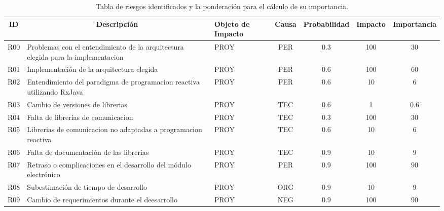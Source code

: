 \begin{table}[ht]
	\begin{tabular}{|c|m{3cm}|m{5em}|c|c|c|c|}
		\hline
		\textbf{ID} & \multicolumn{1}{c|}{\textbf{Descripción}}                                        & \textbf{Objeto de Impacto} & \textbf{Causa} & \textbf{Probabilidad} & \textbf{Impacto} & \textbf{Importancia} \\ \hline
		R00         & Problemas con el entendimiento de la arquitectura elegida para la implementacion & PROY                       & PER            & 0.3                   & 100              & 30                   \\ \hline
		R01         & Implementación de la arquitectura elegida                                        & PROY                       & PER            & 0.6                   & 100              & 60                   \\ \hline
		R02         & Entendimiento del paradigma de programacion reactiva utilizando RxJava           & PROY                       & PER            & 0.6                   & 10               & 6                    \\ \hline
		R03         & Cambio de versiones de librerias                                                 & PROY                       & TEC            & 0.6                   & 1                & 0.6                  \\ \hline
		R04         & Falta de librerías de comunicacion                                               & PROY                       & TEC            & 0.3                   & 100              & 30                   \\ \hline
		R05         & Librerias de comunicacion no adaptadas a programacion reactiva                   & PROY                       & TEC            & 0.6                   & 10               & 6                    \\ \hline
		R06         & Falta de documentación de las librerías                                          & PROY                       & TEC            & 0.9                   & 10               & 9                    \\ \hline
		R07         & Retraso o complicaciones en el desarrollo del módulo electrónico                 & PROY                       & PER            & 0.9                   & 100              & 90                   \\ \hline
		R08         & Subestimación de tiempo de desarrollo                                            & PROY                       & ORG            & 0.9                   & 10               & 9                    \\ \hline
		R09         & Cambio de requerimientos durante el deesarrollo                                  & PROY                       & NEG            & 0.9                   & 100              & 90                   \\ \hline
	\end{tabular}
	\caption[Riesgos Identificados]{Tabla de riesgos identificados y la ponderación para el cálculo de su importancia.}
	\label{table:riegos_identificados}
\end{table}

